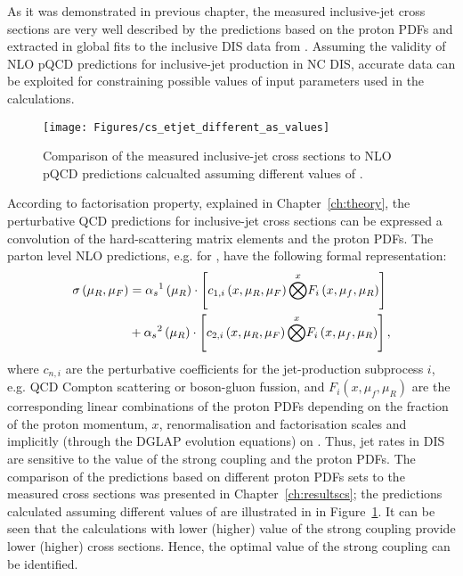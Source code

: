As it was demonstrated in previous chapter, the measured inclusive-jet cross sections are very well described by the predictions based on the proton PDFs and \asz extracted in global fits to the inclusive DIS data from \hera. Assuming the validity of NLO pQCD predictions for inclusive-jet production in NC DIS, accurate data can be exploited for constraining possible values of input parameters used in the calculations.
\begin{figure}[t]
 \centering
 \texttt{[image: Figures/cs\_etjet\_different\_as\_values]}
 \caption{Comparison of the measured inclusive-jet cross sections to NLO pQCD predictions calcualted assuming different values of \asz.}
 \label{fig:etjetdifferentas}
\end{figure}

According to factorisation property, explained in Chapter~\ref{ch:theory}, the perturbative QCD predictions for inclusive-jet cross sections can be expressed a convolution of the hard-scattering matrix elements and the proton PDFs. The parton level NLO predictions, e.g. for \dsdetjetb, have the following formal representation:
\begin{equation}
	\begin{split}
\sigma\left( \mu_R, \mu_F\right)  &= \mbox{$\alpha_{s}$}^1\left( \mu_R\right) \cdot \left[ c_{1,i}\left( x, \mu_R, \mu_F\right) \overset{x}{\bigotimes } F_i\left( x, \mu_f, \mu_R \right) \right] \\
&+ \mbox{$\alpha_{s}$}^2\left( \mu_R\right) \cdot \left[ c_{2,i}\left( x, \mu_R, \mu_F\right) \overset{x}{\bigotimes } F_i\left( x, \mu_f, \mu_R \right) \right],
	\end{split}
\end{equation}
where $c_{n,i}$ are the perturbative coefficients for the jet-production subprocess $i$, e.g. QCD Compton scattering or boson-gluon fussion, and $F_i\left( x, \mu_f, \mu_R \right)$ are the corresponding linear combinations of the proton PDFs depending on the fraction of the proton momentum, $x$, renormalisation and factorisation scales and implicitly (through the DGLAP evolution equations) on \as. Thus, jet rates in DIS are sensitive to the value of the strong coupling and the proton PDFs. The comparison of the predictions based on different proton PDFs sets to the measured cross sections was presented in Chapter~\ref{ch:resultscs}; the predictions calculated assuming different values of \asz are illustrated in in Figure~\ref{fig:etjetdifferentas}. It can be seen that the calculations with lower (higher) value of the strong coupling provide lower (higher) cross sections. Hence, the optimal value of the strong coupling can be identified.

